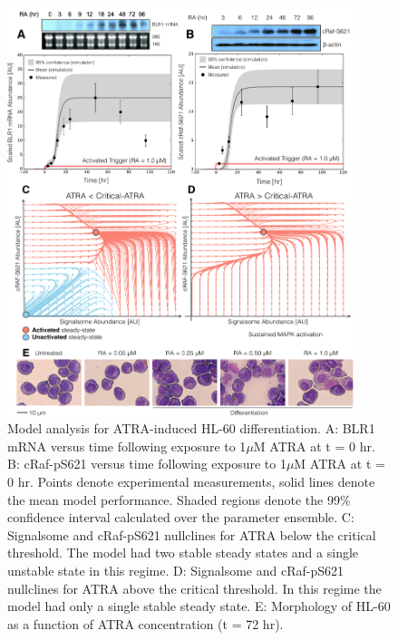 \documentclass[12pt]{article}
\begin{document}
\begin{figure}[!t]\centering
\includegraphics[width=0.90\textwidth]{./figs/Fig-2-cRaf-BLR1-Fit-Analysis.pdf}
\caption{Model analysis for ATRA-induced HL-60 differentiation.
A: BLR1 mRNA versus time following exposure to 1$\mu$M ATRA at t = 0 hr.
B: cRaf-pS621 versus time following exposure to 1$\mu$M ATRA at t = 0 hr.
Points denote experimental measurements, solid lines denote the mean model performance. Shaded regions denote the 99\% confidence interval calculated over the parameter ensemble.
C: Signalsome and cRaf-pS621 nullclines for ATRA below the critical threshold.
The model had two stable steady states and a single unstable state in this regime.
D: Signalsome and cRaf-pS621 nullclines for ATRA above the critical threshold.
In this regime the model had only a single stable steady state.
E: Morphology of HL-60 as a function of ATRA concentration (t = 72 hr). }\label{fig:model-fitting}
\end{figure}
\end{document}
